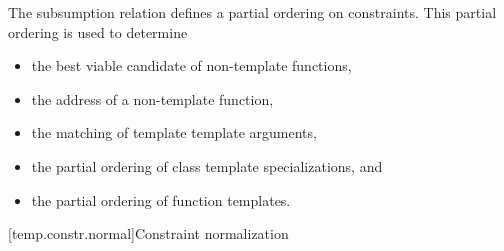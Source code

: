 \documentclass{wg21}
\begin{document}
\pnum
\begin{note}
The subsumption relation defines a partial ordering on constraints.
This partial ordering is used to determine
\begin{itemize}
    \item the best viable candidate of non-template functions,
    \item the address of a non-template function,
    \item the matching of template template arguments,
    \item the partial ordering of class template specializations, and
    \item the partial ordering of function templates.
\end{itemize}
\end{note}


[temp.constr.normal]{Constraint normalization}
%
\end{document}
